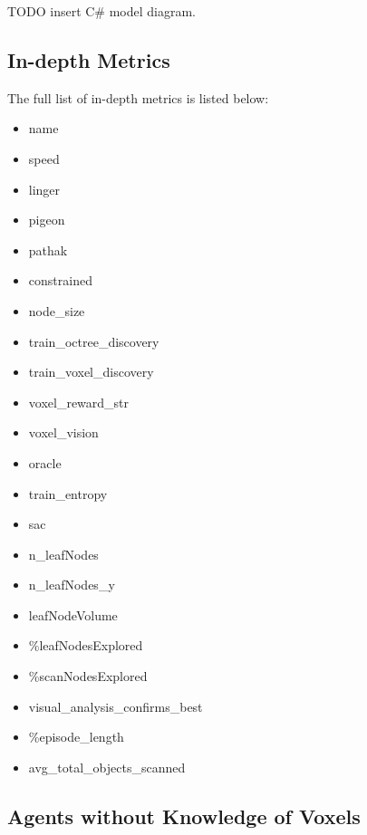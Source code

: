 TODO\: insert C# model diagram.



\subsection{In-depth Metrics}\label{appendix:indepth-metrics}
The full list of in-depth metrics is listed below:
\begin{itemize}
    \item name
    \item speed
    \item linger
    \item pigeon
    \item pathak
    \item constrained
    \item node_size
    \item train_octree_discovery
    \item train_voxel_discovery
    \item voxel_reward_str
    \item voxel_vision
    \item oracle
    \item train_entropy
    \item sac
    \item n_leafNodes
    \item n_leafNodes_y
    \item leafNodeVolume
    \item \%leafNodesExplored
    \item \%scanNodesExplored
    \item visual_analysis_confirms_best
    \item \%episode_length
    \item avg_total_objects_scanned
\end{itemize}

\subsection{Agents without Knowledge of Voxels}\label{appendix:RQ1-results-noknowledgeofvoxels}



